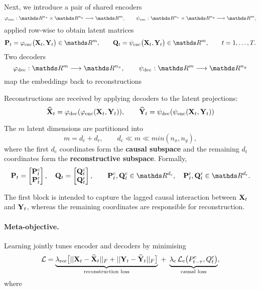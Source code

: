 \documentclass[14pt]{extarticle}
\begin{document}
	Next, we introduce a pair of shared encoders  
	\[
	\varphi_{\text{enc}}:\dR^{n_x}\times \dR^{n_y} \longrightarrow \dR^{m},
	\qquad
	\psi_{\text{enc}}: \dR^{n_x}\times  \dR^{n_y} \longrightarrow \dR^{m},
	\]
	applied row-wise to obtain latent matrices  
	\[
	\bP_t=\varphi_{\text{enc}}\bigl(\bX_t, \bY_t\bigr) \in \dR^{m},
	\qquad
	\bQ_t=\psi_{\text{enc}} \bigl(\bX_t, \bY_t\bigr) \in \dR^{m},
	\qquad
	t=1,\dots ,T.
	\]
	Two decoders  
	\[
	\varphi_{\text{dec}}: \dR^{m} \longrightarrow \dR^{n_x},
	\qquad
	\psi_{\text{dec}}: \dR^{m} \longrightarrow \dR^{n_y}
	\]
	map the embeddings back to reconstructions 
	
	Reconstructions are received by applying decoders to the latent projections:
	\[
	\widehat {\mathbf{X}}_t = \varphi_{\text{dec}}(\varphi_{\text{enc}}(\mathbf{X}_t, \mathbf{Y}_t)),
	\qquad
	\widehat {\mathbf{Y}}_t = \psi_{\text{dec}}(\psi_{\text{enc}}(\mathbf{X}_t, \mathbf{Y}_t))
	\]
	
	The $m$ latent dimensions are partitioned into
	\[
	m=d_{\mathrm c}+d_{\mathrm r}, \qquad d_{\mathrm c}\ll m\ll min(n_x, n_y),
	\]
	where the first $d_{\mathrm c}$ coordinates form the \textbf{causal subspace} and the remaining $d_{\mathrm r}$ coordinates form the \textbf{reconstructive subspace}.  
	Formally,
	\[
	\bP_t=
	\begin{bmatrix}
		\bP_t^{\mathrm c} \\ \bP_t^{\mathrm r}
	\end{bmatrix},
	\quad
	\bQ_t=
	\begin{bmatrix}
		\bQ_t^{\mathrm c} \\ \bQ_t^{\mathrm r}
	\end{bmatrix},
	\qquad
	\bP_t^{\mathrm c}, \bQ_t^{\mathrm c} \in \dR^{d_{\mathrm c}},
	\quad
	\bP_t^{\mathrm r}, \bQ_t^{\mathrm r} \in \dR^{d_{\mathrm r}} .
	\]
	
	The first block is intended to capture the
	lagged causal interaction between $\mathbf{X}_t$ and $\mathbf{Y}_t$, whereas the remaining
	coordinates are responsible for reconstruction.
	
	\paragraph{Meta-objective.}
	Learning jointly tunes encoder and decoders by minimising
	\[
	\mathcal L
	=
	\underbrace{\lambda_{\mathrm{rec}}
		\bigl[
		|| \mathbf{X}_t - \widehat {\mathbf{X}}_t ||_F + || \mathbf{Y}_t - \widehat {\mathbf{Y}}_t ||_F
		\bigr]}_{\text{reconstruction loss}}
	\;+\;
	\underbrace{\lambda_{\mathrm{c}}
		\,\mathcal L_{\mathrm c}\bigl(P_{t-\tau}^{\mathrm c},Q_t^{\mathrm c}\bigr)}_{\text{causal loss}},
	\]
	where  
	
\end{document}

